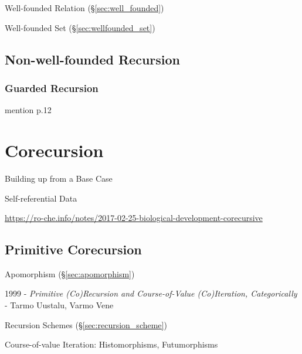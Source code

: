 Well-founded Relation (\S\ref{sec:well_founded})

Well-founded Set (\S\ref{sec:wellfounded_set})



\subsection{Non-well-founded Recursion}
\label{sec:nonwellfounded_recursion}

\subsubsection{Guarded Recursion}\label{sec:guarded_recursion}

mention \cite{abramsky-gay-nagarajan96} p.12

\cite{atkey-mcbride13}



\section{Corecursion}\label{sec:corecursion}

Building up from a Base Case

Self-referential Data

\url{https://ro-che.info/notes/2017-02-25-biological-development-corecursive}



\subsection{Primitive Corecursion}\label{sec:primitive_corecursion}

Apomorphism (\S\ref{sec:apomorphism})

1999 - \emph{Primitive (Co)Recursion and Course-of-Value (Co)Iteration,
  Categorically} - Tarmo Uustalu, Varmo Vene

Recursion Schemes (\S\ref{sec:recursion_scheme})

Course-of-value Iteration: Histomorphisms, Futumorphisms



